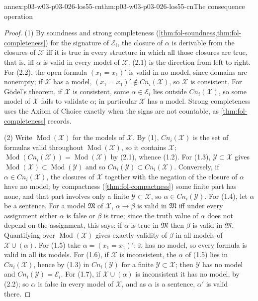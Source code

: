 \begin{annexitem}{annex:p03-w03-p03-026-los55-cn}{thm:p03-w03-p03-026-los55-cn}{The consequence operation}
\begin{proof}
(1) By soundness and strong completeness
(\cref{thm:fol-soundness,thm:fol-completeness}) for the signature of
\(\mathcal E_i\), the closure of \(\alpha\) is derivable from the closures of
\(\mathcal X\) iff it is true in every structure in which all those closures
are true, that is, iff \(\alpha\) is valid in every model of \(\mathcal X\).
(2.1) is the direction from left to right.  For (2.2), the open formula
\((x_1=x_1)'\) is valid in no model, since domains are nonempty; if
\(\mathcal X\) has a model, \((x_1=x_1)'\notin\mathit{Cn}_i(\mathcal X)\), so
\(\mathcal X\) is consistent.  For G\"odel's theorem, if \(\mathcal X\) is
consistent, some \(\alpha\in\mathcal E_i\) lies outside
\(\mathit{Cn}_i(\mathcal X)\), so some model of \(\mathcal X\) fails to
validate \(\alpha\); in particular \(\mathcal X\) has a model.  Strong
completeness uses the Axiom of Choice exactly when the signs are not
countable, as \cref{thm:fol-completeness} records.

(2) Write \(\operatorname{Mod}(\mathcal X)\) for the models of \(\mathcal X\).
By (1), \(\mathit{Cn}_i(\mathcal X)\) is the set of formulas valid throughout
\(\operatorname{Mod}(\mathcal X)\), so it contains \(\mathcal X\);
\(\operatorname{Mod}(\mathit{Cn}_i(\mathcal X))=\operatorname{Mod}(\mathcal X)\)
by (2.1), whence (1.2).  For (1.3), \(\mathcal Y\subset\mathcal X\) gives
\(\operatorname{Mod}(\mathcal X)\subset\operatorname{Mod}(\mathcal Y)\) and so
\(\mathit{Cn}_i(\mathcal Y)\subset\mathit{Cn}_i(\mathcal X)\).  Conversely,
if \(\alpha\in\mathit{Cn}_i(\mathcal X)\), the closures of \(\mathcal X\)
together with the negation of the closure of \(\alpha\) have no model; by
compactness (\cref{thm:fol-compactness}) some finite part has none, and that
part involves only a finite \(\mathcal Y\subset\mathcal X\), so
\(\alpha\in\mathit{Cn}_i(\mathcal Y)\).  For (1.4), let \(\alpha\) be a
sentence.  For a model \(\mathfrak M\) of \(\mathcal X\), \(\alpha\to\beta\) is
valid in \(\mathfrak M\) iff under every assignment either \(\alpha\) is false
or \(\beta\) is true; since the truth value of \(\alpha\) does not depend on
the assignment, this says: if \(\alpha\) is true in \(\mathfrak M\) then
\(\beta\) is valid in \(\mathfrak M\).  Quantifying over
\(\operatorname{Mod}(\mathcal X)\) gives exactly validity of \(\beta\) in all
models of \(\mathcal X\cup(\alpha)\).  For (1.5) take
\(\alpha=(x_1=x_1)'\): it has no model, so every formula is valid in all its
models.  For (1.6), if \(\mathcal X\) is inconsistent, the \(\alpha\) of
(1.5) lies in \(\mathit{Cn}_i(\mathcal X)\), hence by (1.3) in
\(\mathit{Cn}_i(\mathcal Y)\) for a finite \(\mathcal Y\subset\mathcal X\);
then \(\mathcal Y\) has no model and \(\mathit{Cn}_i(\mathcal Y)=\mathcal E_i\).
For (1.7), if \(\mathcal X\cup(\alpha)\) is inconsistent it has no model, by
(2.2); so \(\alpha\) is false in every model of \(\mathcal X\), and as
\(\alpha\) is a sentence, \(\alpha'\) is valid there.


\end{proof}
\end{annexitem}
